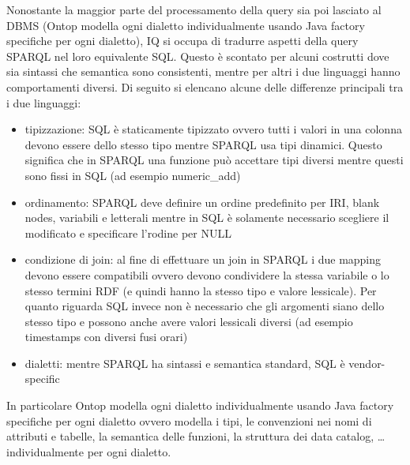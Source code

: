 \begin{comment}
Formalmente quest'algebra è definita come:
\begin{equation}
    \begin{split}
        \phi := &P(t) \ | \ PROJ_\tau^x \ \phi \ \ | \ AGG_\tau^x \ \phi \ \ | \  DISTINCT \ \phi \ \ | \ ORDERBY_x \ \phi \ \ | \\
                &SLICE_i,j \ \phi \ \ |\ FILTER_\beta \ \phi \ \ | \ JOIN_\beta (\phi_1, \dots, \phi_k ) \ | \\
                &LEFTJOIN_\beta(\phi_1, \phi_2) \ | \ UNION(\phi_1, \dots, \phi_k ) 
    \end{split}
\end{equation}
dove $P$ è il nome di una relazione, $t$ è una tupla di termini, $x$ è una tupla di variabili, $\tau$ è una sostituzione, $i,j$ sono numeri naturali che descrivono il limite e l'offset e $\beta$ è un termine booleano.
\end{comment}
    
Nonostante la maggior parte del processamento della query sia poi lasciato al DBMS (Ontop modella ogni dialetto individualmente usando Java factory specifiche per ogni dialetto), IQ si occupa di tradurre aspetti della query SPARQL nel loro equivalente SQL. Questo è scontato per alcuni costrutti dove sia sintassi che 
semantica sono consistenti, mentre per altri i due linguaggi hanno comportamenti diversi. Di seguito si elencano alcune delle differenze principali tra i due linguaggi: \cite{Ontop}
\begin{itemize}
    \item tipizzazione: SQL è staticamente tipizzato ovvero tutti i valori in una colonna devono essere dello stesso tipo mentre SPARQL usa tipi dinamici. Questo significa che in SPARQL una funzione può accettare tipi diversi mentre questi
        sono fissi in SQL (ad esempio numeric\_add)
    \item ordinamento: SPARQL deve definire un ordine predefinito per IRI, blank nodes, variabili e letterali mentre in SQL è solamente necessario scegliere il modificato e specificare l'rodine per NULL
    \item condizione di join: al fine di effettuare un join in SPARQL i due mapping devono essere compatibili ovvero devono condividere la stessa variabile o lo stesso termini RDF (e quindi hanno la stesso tipo e valore lessicale). Per quanto 
        riguarda SQL invece non è necessario che gli argomenti siano dello stesso tipo e possono anche avere valori lessicali diversi (ad esempio timestamps con diversi fusi orari)
    \item dialetti: mentre SPARQL ha sintassi e semantica standard, SQL è vendor-specific 
\end{itemize}
In particolare Ontop modella ogni dialetto individualmente usando Java factory specifiche per ogni dialetto ovvero modella i tipi, le convenzioni nei nomi di attributi e tabelle, la semantica delle funzioni, la struttura dei data catalog, \dots individualmente per ogni dialetto. 

